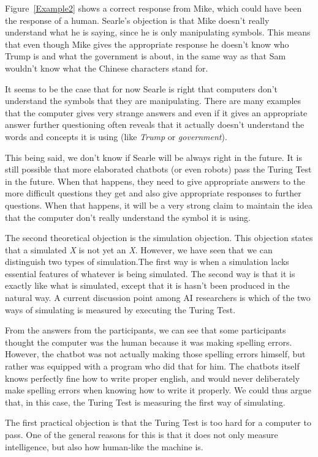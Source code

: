Figure~\ref{Example2} shows a correct response from Mike, which could have been the response of a human. Searle's objection is that Mike doesn't really understand what he is saying, since he is only manipulating symbols. This means that even though Mike gives the appropriate response he doesn't know who Trump is and what the government is about, in the same way as that Sam wouldn't know what the Chinese characters stand for.

It seems to be the case that for now Searle is right that computers don't understand the symbols that they are manipulating. There are many examples that the computer gives very strange answers and even if it gives an appropriate answer further questioning often reveals that it actually doesn't understand the words and concepts it is using (like \textit{Trump} or \textit{government}).

This being said, we don't know if Searle will be always right in the future. It is still possible that more elaborated chatbots (or even robots) pass the Turing Test in the future. When that happens, they need to give appropriate answers to the more difficult questions they get and also give appropriate responses to further questions. When that happens, it will be a very strong claim to maintain the idea that the computer don't really understand the symbol it is using.

The second theoretical objection is the simulation objection. This objection states that a simulated \textit{X} is not yet an \textit{X}. However, we have seen that we can distinguish two types of simulation.The first way is when a simulation lacks essential features of whatever is being simulated. The second way is that it is exactly like what is simulated, except that it is hasn't been produced in the natural way. A current discussion point among AI researchers is which of the two ways of simulating is measured by executing the Turing Test.

From the answers from the participants, we can see that some participants thought the computer was the human because it was making spelling errors. However, the chatbot was not actually making those spelling errors himself, but rather was equipped with a program who did that for him. The chatbots itself knows perfectly fine how to write proper english, and would never deliberately make spelling errors when knowing how to write it properly. We could thus argue that, in this case, the Turing Test is measuring the first way of simulating.

The first practical objection is that the Turing Test is too hard for a computer to pass. One of the general reasons for this is that it does not only measure intelligence, but also how human-like the machine is.

